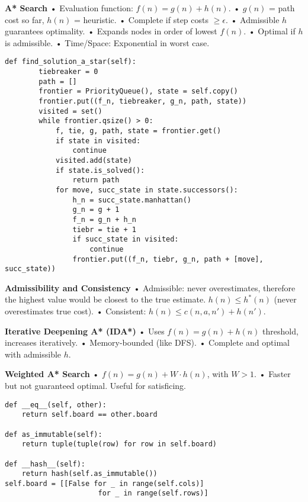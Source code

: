 ﻿\documentclass[10pt]{article}
\begin{document}
\begin{multicols*}{2}
\textbf{A* Search}  
• Evaluation function: $f(n) = g(n) + h(n)$.  
• $g(n)$ = path cost so far, $h(n)$ = heuristic.  
• Complete if step costs $\geq \epsilon$.  
• Admissible $h$ guarantees optimality.  
• Expands nodes in order of lowest $f(n)$.  
• Optimal if $h$ is admissible.  
• Time/Space: Exponential in worst case.  
\begin{minipage}{\linewidth}
\begin{lstlisting}
def find_solution_a_star(self):    
        tiebreaker = 0
        path = []
        frontier = PriorityQueue(), state = self.copy()
        frontier.put((f_n, tiebreaker, g_n, path, state))
        visited = set()
        while frontier.qsize() > 0:
            f, tie, g, path, state = frontier.get()
            if state in visited:
                continue
            visited.add(state)
            if state.is_solved():
                return path
            for move, succ_state in state.successors():
                h_n = succ_state.manhattan()
                g_n = g + 1
                f_n = g_n + h_n
                tiebr = tie + 1
                if succ_state in visited:
                    continue
                frontier.put((f_n, tiebr, g_n, path + [move], succ_state))
\end{lstlisting}
\end{minipage}

\textbf{Admissibility and Consistency}  
• Admissible: never overestimates, therefore the highest value would be closest to the true estimate. $h(n) \leq h^*(n)$ (never overestimates true cost).  
• Consistent: $h(n) \leq c(n,a,n') + h(n')$.  

\textbf{Iterative Deepening A* (IDA*)}  
• Uses $f(n)=g(n)+h(n)$ threshold, increases iteratively.  
• Memory-bounded (like DFS).  
• Complete and optimal with admissible $h$.  

\textbf{Weighted A* Search}  
• $f(n) = g(n) + W \cdot h(n)$, with $W > 1$.  
• Faster but not guaranteed optimal. Useful for satisficing.  

\begin{lstlisting}
def __eq__(self, other):
    return self.board == other.board

def as_immutable(self):
    return tuple(tuple(row) for row in self.board)

def __hash__(self):
    return hash(self.as_immutable())
self.board = [[False for _ in range(self.cols)]
                      for _ in range(self.rows)]
\end{lstlisting}



\end{multicols*}
\end{document}
